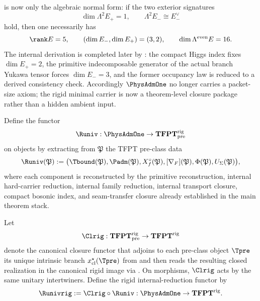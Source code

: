 \begin{tcolorbox}[colback=orange!5, colframe=orange!70!black, breakable,
    title={Carrier closure is now split cleanly},
    colbacktitle=orange!75!black]
 is now only the algebraic normal form: if the two exterior
signatures
\[
\dim\Lambda^2E_+=1,
\qquad
\Lambda^2E_-\cong E_-^\vee
\]
hold, then one necessarily has
\[
\rank E=5,
\qquad
(\dim E_-,\dim E_+)=(3,2),
\qquad
\dim\Lambda^{\mathrm{even}}E=16.
\]
The internal derivation is completed later by :
the compact Higgs index fixes $\dim E_+=2$, the primitive indecomposable generator of the actual
branch Yukawa tensor forces $\dim E_-=3$, and the former occupancy law is reduced to a derived
consistency check.
Accordingly $\PhysAdmOne$ no longer carries a packet-size axiom; the rigid minimal carrier is now a
theorem-level closure package rather than a hidden ambient input.
\end{tcolorbox}

\begin{definition}
\label{def:universal-reduction}
Define the functor
\[
\Runiv:\PhysAdmOne\to \mathbf{TFPT}^{\mathrm{rig}}_{\mathrm{pre}}
\]
on objects by extracting from $\mathfrak P$ the TFPT pre-class data
\[
\Runiv(\mathfrak P):=
\bigl(
    \Tbound(\mathfrak P),
\Padm(\mathfrak P),
X_f^\circ(\mathfrak P),
[\nabla_F](\mathfrak P),
\Phi(\mathfrak P),
U_\Sigma(\mathfrak P)
\bigr),
\]
where each component is reconstructed by the primitive reconstruction, internal hard-carrier
reduction, internal family reduction, internal transport closure, compact bosonic index, and
seam-transfer closure already
established in the main theorem stack.
\end{definition}

\begin{definition}
\label{def:rigid-closure-functor}
Let
\[
\Clrig:\mathbf{TFPT}^{\mathrm{rig}}_{\mathrm{pre}}\to \mathbf{TFPT}^{\mathrm{rig}}
\]
denote the canonical closure functor that adjoins to each pre-class object $\Tpre$ its unique
intrinsic branch $x_{\mathrm{cl}}^\star(\Tpre)$ from  and then reads
the resulting closed realization in the canonical rigid image via
. On morphisms,
$\Clrig$ acts by the same unitary intertwiners. Define the rigid internal-reduction functor by
\[
\Runivrig:=\Clrig\circ \Runiv:\PhysAdmOne\to \mathbf{TFPT}^{\mathrm{rig}}.
\]
\end{definition}

